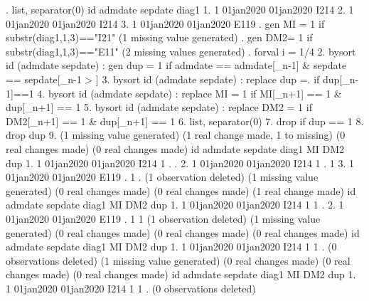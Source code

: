 . list, separator(0)
{\smallskip}
     {\TLC}
     {\VBAR} id     admdate     sepdate   diag1 {\VBAR}
     {\LFTT}
  1. {\VBAR}  1   01jan2020   01jan2020    I214 {\VBAR}
  2. {\VBAR}  1   01jan2020   01jan2020    I214 {\VBAR}
  3. {\VBAR}  1   01jan2020   01jan2020    E119 {\VBAR}
     {\BLC}
{\smallskip}
. gen MI = 1 if substr(diag1,1,3)=="I21"
(1 missing value generated)
{\smallskip}
. gen DM2= 1 if substr(diag1,1,3)=="E11"
(2 missing values generated)
{\smallskip}
. forval i = 1/4 {\lbr}
  2. bysort id (admdate sepdate) : gen dup = 1 if admdate == admdate[_n-1] \& sepdate == sepdate[_n-1
> ]
  3. bysort id (admdate sepdate) : replace dup =. if dup[_n-1]==1
  4. bysort id (admdate sepdate) : replace MI = 1 if MI[_n+1] == 1 \& dup[_n+1] == 1
  5. bysort id (admdate sepdate) : replace DM2 = 1 if DM2[_n+1] == 1 \& dup[_n+1] == 1
  6. list, separator(0)
  7. drop if dup == 1
  8. drop dup
  9. {\rbr}
(1 missing value generated)
(1 real change made, 1 to missing)
(0 real changes made)
(0 real changes made)
{\smallskip}
     {\TLC}
     {\VBAR} id     admdate     sepdate   diag1   MI   DM2   dup {\VBAR}
     {\LFTT}
  1. {\VBAR}  1   01jan2020   01jan2020    I214    1     .     . {\VBAR}
  2. {\VBAR}  1   01jan2020   01jan2020    I214    1     .     1 {\VBAR}
  3. {\VBAR}  1   01jan2020   01jan2020    E119    .     1     . {\VBAR}
     {\BLC}
(1 observation deleted)
(1 missing value generated)
(0 real changes made)
(0 real changes made)
(1 real change made)
{\smallskip}
     {\TLC}
     {\VBAR} id     admdate     sepdate   diag1   MI   DM2   dup {\VBAR}
     {\LFTT}
  1. {\VBAR}  1   01jan2020   01jan2020    I214    1     1     . {\VBAR}
  2. {\VBAR}  1   01jan2020   01jan2020    E119    .     1     1 {\VBAR}
     {\BLC}
(1 observation deleted)
(1 missing value generated)
(0 real changes made)
(0 real changes made)
(0 real changes made)
{\smallskip}
     {\TLC}
     {\VBAR} id     admdate     sepdate   diag1   MI   DM2   dup {\VBAR}
     {\LFTT}
  1. {\VBAR}  1   01jan2020   01jan2020    I214    1     1     . {\VBAR}
     {\BLC}
(0 observations deleted)
(1 missing value generated)
(0 real changes made)
(0 real changes made)
(0 real changes made)
{\smallskip}
     {\TLC}
     {\VBAR} id     admdate     sepdate   diag1   MI   DM2   dup {\VBAR}
     {\LFTT}
  1. {\VBAR}  1   01jan2020   01jan2020    I214    1     1     . {\VBAR}
     {\BLC}
(0 observations deleted)
{\smallskip}
